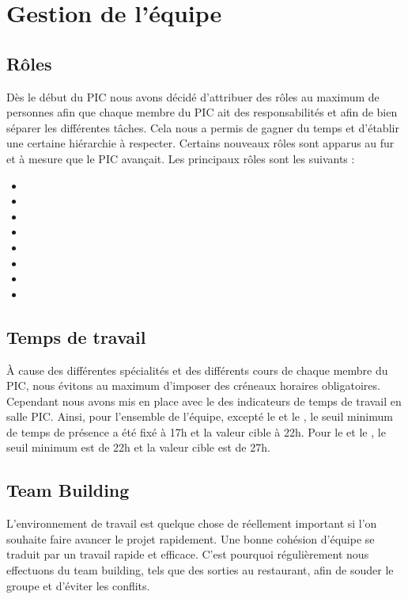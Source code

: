 \documentclass[asi]{picInsa}
\begin{document}
\section{Gestion de l'équipe}
\subsection{Rôles}
Dès le début du PIC nous avons décidé d'attribuer des rôles au maximum de personnes afin que chaque membre du PIC ait des responsabilités et afin de bien séparer les différentes tâches. Cela nous a permis de gagner du temps et d’établir une certaine hiérarchie à respecter. Certains nouveaux rôles sont apparus au fur et à mesure que le PIC avançait. Les principaux rôles sont les suivants : 
\begin{itemize}
	\item \CP{}
	\item \CPA{}
	\item \RQ{}
	\item \RQA{}
	\item \RGC{}
	\item \RD{}
	\item \RRS{}
	\item \RS{}
\end{itemize}

\subsection{Temps de travail}
À cause des différentes spécialités et des différents cours de chaque membre du PIC, nous évitons au maximum d'imposer des créneaux horaires obligatoires. Cependant nous avons mis en place avec le \RQ{} des indicateurs de temps de travail en salle PIC. Ainsi, pour l'ensemble de l'équipe, excepté le \CP{} et le \RQ{}, le seuil minimum de temps de présence a été fixé à 17h et la valeur cible à 22h. Pour le \CP{} et le \RQ{}, le seuil minimum est de 22h et la valeur cible est de 27h.

\subsection{Team Building}
L'environnement de travail est quelque chose de réellement important si l'on souhaite faire avancer le projet rapidement. Une bonne cohésion d'équipe se traduit par un travail rapide et efficace. C'est pourquoi régulièrement nous effectuons du team building, tels que des sorties au restaurant, afin de souder le groupe et d'éviter les conflits.
\end{document}

